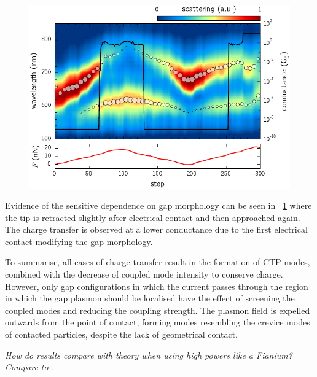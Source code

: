 \documentclass[a4paper]{article}
\begin{document}
\begin{figure}[h]
\includegraphics{figures/echem_tip_dimer_tunnelling_focus_2}
\caption[]{}
\label{fig:gap_morphology_modification}
\end{figure}

Evidence of the sensitive dependence on gap morphology can be seen in \figurename~\ref{fig:gap_morphology_modification} where the tip is retracted slightly after electrical contact and then approached again. The charge transfer is observed at a lower conductance due to the first electrical contact modifying the gap morphology.

To summarise, all cases of charge transfer result in the formation of CTP modes, combined with the decrease of coupled mode intensity to conserve charge. However, only gap configurations in which the current passes through the region in which the gap plasmon should be localised have the effect of screening the coupled modes and reducing the coupling strength. The plasmon field is expelled outwards from the point of contact, forming modes resembling the crevice modes of contacted particles, despite the lack of geometrical contact.

\emph{How do results compare with theory when using high powers like a Fianium? Compare to \cite{marinica2012}.}
\end{document}
